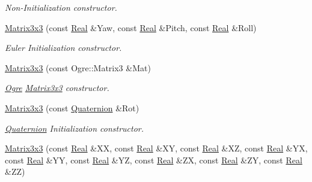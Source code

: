 \begin{DoxyCompactItemize}
\begin{DoxyCompactList}\small\item\em Non-\/Initialization constructor. \item\end{DoxyCompactList}\item 
\hyperlink{classMezzanine_1_1Matrix3x3_a83e49cecf9bbb31dc55b18cde6f22aa3}{Matrix3x3} (const \hyperlink{namespaceMezzanine_a726731b1a7df72bf3583e4a97282c6f6}{Real} \&Yaw, const \hyperlink{namespaceMezzanine_a726731b1a7df72bf3583e4a97282c6f6}{Real} \&Pitch, const \hyperlink{namespaceMezzanine_a726731b1a7df72bf3583e4a97282c6f6}{Real} \&Roll)
\begin{DoxyCompactList}\small\item\em Euler Initialization constructor. \item\end{DoxyCompactList}\item 
\hyperlink{classMezzanine_1_1Matrix3x3_aae4d01bc09a55d2b3460defd0c228dea}{Matrix3x3} (const Ogre::Matrix3 \&Mat)
\begin{DoxyCompactList}\small\item\em \hyperlink{namespaceOgre}{Ogre} \hyperlink{classMezzanine_1_1Matrix3x3}{Matrix3x3} constructor. \item\end{DoxyCompactList}\item 
\hyperlink{classMezzanine_1_1Matrix3x3_af4a8dc5beaae2db350054e6400542a26}{Matrix3x3} (const \hyperlink{classMezzanine_1_1Quaternion}{Quaternion} \&Rot)
\begin{DoxyCompactList}\small\item\em \hyperlink{classMezzanine_1_1Quaternion}{Quaternion} Initialization constructor. \item\end{DoxyCompactList}\item 
\hyperlink{classMezzanine_1_1Matrix3x3_aaa50807721233a361977a8debaf74f9d}{Matrix3x3} (const \hyperlink{namespaceMezzanine_a726731b1a7df72bf3583e4a97282c6f6}{Real} \&XX, const \hyperlink{namespaceMezzanine_a726731b1a7df72bf3583e4a97282c6f6}{Real} \&XY, const \hyperlink{namespaceMezzanine_a726731b1a7df72bf3583e4a97282c6f6}{Real} \&XZ, const \hyperlink{namespaceMezzanine_a726731b1a7df72bf3583e4a97282c6f6}{Real} \&YX, const \hyperlink{namespaceMezzanine_a726731b1a7df72bf3583e4a97282c6f6}{Real} \&YY, const \hyperlink{namespaceMezzanine_a726731b1a7df72bf3583e4a97282c6f6}{Real} \&YZ, const \hyperlink{namespaceMezzanine_a726731b1a7df72bf3583e4a97282c6f6}{Real} \&ZX, const \hyperlink{namespaceMezzanine_a726731b1a7df72bf3583e4a97282c6f6}{Real} \&ZY, const \hyperlink{namespaceMezzanine_a726731b1a7df72bf3583e4a97282c6f6}{Real} \&ZZ)

\end{DoxyCompactItemize}
